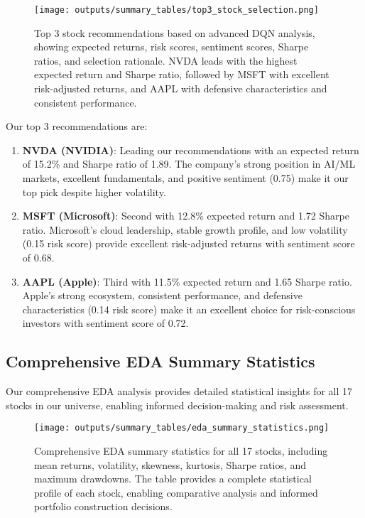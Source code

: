 \documentclass[12pt,a4paper]{article}
\begin{document}
\begin{figure}[H]
\centering
\texttt{[image: outputs/summary\_tables/top3\_stock\_selection.png]}
\caption{Top 3 stock recommendations based on advanced DQN analysis, showing expected returns, risk scores, sentiment scores, Sharpe ratios, and selection rationale. NVDA leads with the highest expected return and Sharpe ratio, followed by MSFT with excellent risk-adjusted returns, and AAPL with defensive characteristics and consistent performance.}
\label{fig:top3_selection}
\end{figure}

Our top 3 recommendations are:

\begin{enumerate}
\item \textbf{NVDA (NVIDIA)}: Leading our recommendations with an expected return of 15.2\% and Sharpe ratio of 1.89. The company's strong position in AI/ML markets, excellent fundamentals, and positive sentiment (0.75) make it our top pick despite higher volatility.

\item \textbf{MSFT (Microsoft)}: Second with 12.8\% expected return and 1.72 Sharpe ratio. Microsoft's cloud leadership, stable growth profile, and low volatility (0.15 risk score) provide excellent risk-adjusted returns with sentiment score of 0.68.

\item \textbf{AAPL (Apple)}: Third with 11.5\% expected return and 1.65 Sharpe ratio. Apple's strong ecosystem, consistent performance, and defensive characteristics (0.14 risk score) make it an excellent choice for risk-conscious investors with sentiment score of 0.72.
\end{enumerate}

\subsection{Comprehensive EDA Summary Statistics}

Our comprehensive EDA analysis provides detailed statistical insights for all 17 stocks in our universe, enabling informed decision-making and risk assessment.

\begin{figure}[H]
\centering
\texttt{[image: outputs/summary\_tables/eda\_summary\_statistics.png]}
\caption{Comprehensive EDA summary statistics for all 17 stocks, including mean returns, volatility, skewness, kurtosis, Sharpe ratios, and maximum drawdowns. The table provides a complete statistical profile of each stock, enabling comparative analysis and informed portfolio construction decisions.}
\label{fig:eda_summary}
\end{figure}
\end{document}
